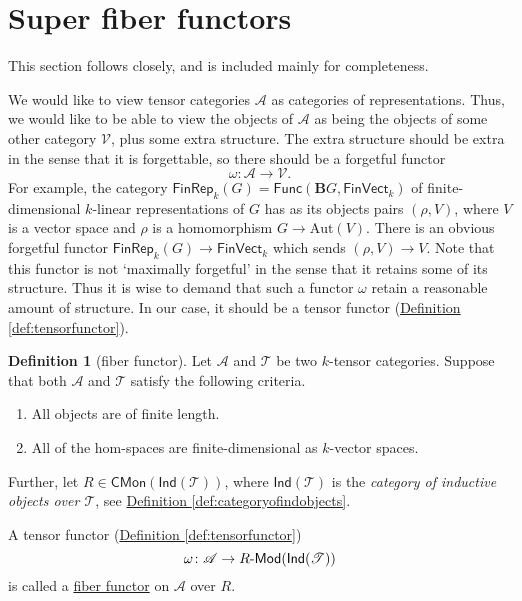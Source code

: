 \documentclass[a4paper,10pt]{scrreprt}
\newcommand{\defn}[1]{\ul{#1}}
\def\mhyp{{\hbox{-}}}
\theoremstyle{definition}
\newtheorem{definition}{Definition}[section]
\theoremstyle{plain}
\theoremstyle{remark}
\begin{document}
\section{Super fiber functors}
This section follows \cite{nlab-deligne-theorem} closely, and is included mainly for completeness.

We would like to view tensor categories $\mathscr{A}$ as categories of representations. Thus, we would like to be able to view the objects of $\mathscr{A}$ as being the objects of some other category $\mathscr{V}$, plus some extra structure. The extra structure should be extra in the sense that it is forgettable, so there should be a forgetful functor
\begin{equation*}
  \omega\colon \mathscr{A} \rightarrow \mathscr{V}.
\end{equation*}
For example, the category $\mathsf{FinRep}_{k}(G) = \mathsf{Func}(\mathbf{B}G, \mathsf{FinVect}_{k})$ of finite-dimensional $k$-linear representations of $G$ has as its objects pairs $(\rho, V)$, where $V$ is a vector space and $\rho$ is a homomorphism $G \to \mathrm{Aut}(V)$. There is an obvious forgetful functor $\mathsf{FinRep}_{k}(G) \to \mathsf{FinVect}_{k}$ which sends $(\rho, V) \to V$. Note that this functor is not `maximally forgetful' in the sense that it retains some of its structure. Thus it is wise to demand that such a functor $\omega$ retain a reasonable amount of structure. In our case, it should be a tensor functor (\hyperref[def:tensorfunctor]{Definition \ref*{def:tensorfunctor}}).

\begin{definition}[fiber functor]
  \label{def:fiberfunctor}
  Let $\mathscr{A}$ and $\mathscr{T}$ be two $k$-tensor categories. Suppose that both $\mathscr{A}$ and $\mathscr{T}$ satisfy the following criteria.
  \begin{enumerate}
    \item All objects are of finite length.

    \item All of the hom-spaces are finite-dimensional as $k$-vector spaces.
  \end{enumerate}

  Further, let $R \in \mathsf{CMon}(\mathsf{Ind}(\mathscr{T}))$, where $\mathsf{Ind}(\mathscr{T})$ is the \emph{category of inductive objects over $\mathscr{T}$}, see \hyperref[def:categoryofindobjects]{Definition \ref*{def:categoryofindobjects}}.

  A tensor functor (\hyperref[def:tensorfunctor]{Definition \ref*{def:tensorfunctor}})
  \begin{equation*}
    \omega\colon \mathscr{A} \to R\mhyp\mathsf{Mod}(\mathsf{Ind}(\mathscr{T}))
  \end{equation*}
  is called a \defn{fiber functor} on $\mathscr{A}$ over $R$.
\end{definition}
\end{document}
